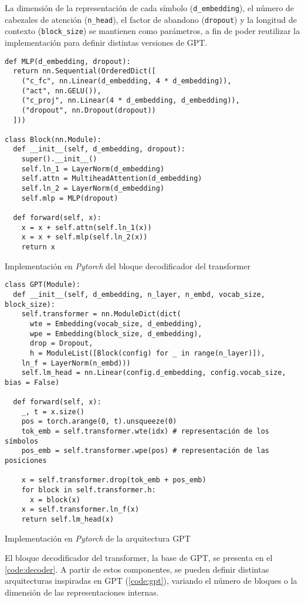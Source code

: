 La dimensión de la representación de cada símbolo (\texttt{d\_embedding}), el número de cabezales de atención (\texttt{n\_head}), el factor de abandono (\texttt{dropout}) y la longitud de contexto (\texttt{block\_size}) se mantienen como parámetros, a fin de poder reutilizar la implementación para definir distintas versiones de GPT. 

\begin{code}
\begin{verbatim}
def MLP(d_embedding, dropout):
  return nn.Sequential(OrderedDict([
    ("c_fc", nn.Linear(d_embedding, 4 * d_embedding)),
    ("act", nn.GELU()),
    ("c_proj", nn.Linear(4 * d_embedding, d_embedding)),
    ("dropout", nn.Dropout(dropout))
  ]))

class Block(nn.Module):
  def __init__(self, d_embedding, dropout):
    super().__init__()
    self.ln_1 = LayerNorm(d_embedding)
    self.attn = MultiheadAttention(d_embedding)
    self.ln_2 = LayerNorm(d_embedding)
    self.mlp = MLP(dropout)

  def forward(self, x):
    x = x + self.attn(self.ln_1(x))
    x = x + self.mlp(self.ln_2(x))
    return x
\end{verbatim}
\caption{Implementación en \textit{Pytorch} del bloque decodificador del transformer}
\label{code:decoder}
\end{code}

\begin{code}
\begin{verbatim}
class GPT(Module):
  def __init__(self, d_embedding, n_layer, n_embd, vocab_size, block_size):
    self.transformer = nn.ModuleDict(dict(
      wte = Embedding(vocab_size, d_embedding),
      wpe = Embedding(block_size, d_embedding),
      drop = Dropout,
      h = ModuleList([Block(config) for _ in range(n_layer)]),
    ln_f = LayerNorm(n_embd)))
    self.lm_head = nn.Linear(config.d_embedding, config.vocab_size, bias = False)

  def forward(self, x):
    _, t = x.size()
    pos = torch.arange(0, t).unsqueeze(0)
    tok_emb = self.transformer.wte(idx) # representación de los símbolos
    pos_emb = self.transformer.wpe(pos) # representación de las posiciones

    x = self.transformer.drop(tok_emb + pos_emb)
    for block in self.transformer.h:
      x = block(x)
    x = self.transformer.ln_f(x)
    return self.lm_head(x)
\end{verbatim}
\caption{Implementación en \textit{Pytorch} de la arquitectura GPT}
\label{code:gpt}
\end{code}

El bloque decodificador del transformer, la base de GPT, se presenta en el \cref{code:decoder}. A partir de estos componentes, se pueden definir distintas arquitecturas inspiradas en GPT (\cref{code:gpt}), variando el número de bloques o la dimensión de las representaciones internas.
